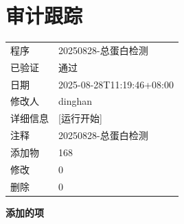 \documentclass[UTF8,10pt,a4paper,fontset=fandol]{ctexart}
\newcommand{\fieldvalue}[1]{#1}
\begin{document}
\section*{审计跟踪}

\begin{tabular}{p{2.2cm}p{11cm}}
程序&
\fieldvalue{20250828-总蛋白检测}\\
已验证&
\fieldvalue{通过}\\
日期&
\fieldvalue{2025-08-28T11:19:46+08:00}\\
修改人&
\fieldvalue{dinghan}\\
详细信息&
\fieldvalue{[运行开始]}\\
注释&
\fieldvalue{20250828-总蛋白检测}\\
添加物&
\fieldvalue{168}\\
修改&
\fieldvalue{0}\\
删除&
\fieldvalue{0}\\
\end{tabular}

\vspace{0.5em}

\noindent\textbf{添加的项}
\end{document}
